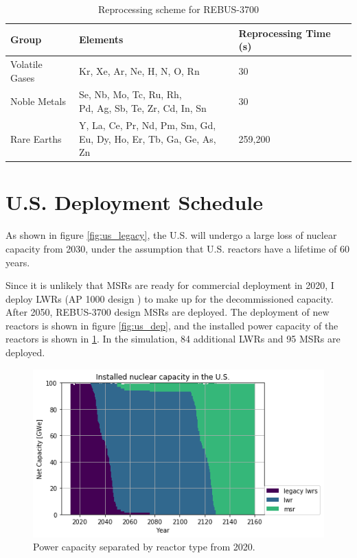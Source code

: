 \begin{table}[h]
	\centering
	\caption{Reprocessing scheme for REBUS-3700}
	\label{tab:rebus_reproc}
	\begin{tabular}{lll}
		\hline
		Group & Elements & Reprocessing Time (s) \\
		\hline
		Volatile Gases & Kr, Xe, Ar, Ne, H, N, O, Rn & 30 \\
		Noble Metals & \shortstack{Se, Nb, Mo, Tc, Ru, Rh,\\ Pd, Ag, Sb, Te, Zr, Cd, In, Sn} & 30 \\
		Rare Earths & \shortstack{Y, La, Ce, Pr, Nd, Pm, Sm, Gd, \\ Eu, Dy, Ho, Er, Tb, Ga, Ge, As, Zn} & 259,200 \\
		\hline
	\end{tabular}
\end{table}



\section{U.S. Deployment Schedule}

As shown in figure \ref{fig:us_legacy}, the U.S. will
undergo a large loss of nuclear capacity from 2030, under the
assumption that U.S. reactors have a lifetime of 60 years.

Since it is unlikely that \glspl{MSR} are ready for
commercial deployment in 2020, I deploy \glspl{LWR} (AP 1000 design \cite{sutharshan_ap1000tm_2011})
to make up for the decommissioned capacity. After 2050,
REBUS-3700 design \glspl{MSR} are deployed. The deployment of new reactors
is shown in figure \ref{fig:us_dep}, and the installed
power capacity of the reactors is shown in \ref{fig:us_pow}.
In the simulation, 84 additional \glspl{LWR} and 95 \glspl{MSR}
are deployed.

\begin{figure}[htbp!]
	\begin{center}
		\includegraphics[scale=0.7]{./images/us/power_plot.png}
	\end{center}
	\caption{Power capacity separated by reactor type from 2020.}
	\label{fig:us_pow}
\end{figure}

